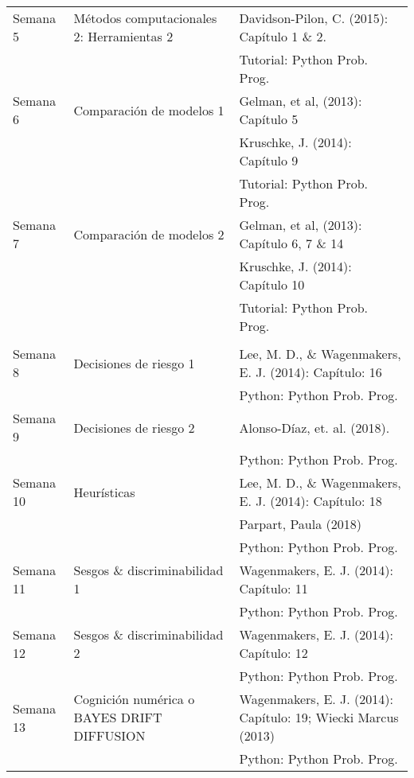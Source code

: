 \documentclass[letterpaper]{inzane_syllabus} %
\begin{document}
\begin{center}
\begin{tabularx}{\textwidth}{p{2cm}p{8cm}p{9.5cm}}
\arrayrulecolor{maingray}\hline
Semana 5 & Métodos computacionales 2: Herramientas 2  & Davidson-Pilon, C. (2015): Capítulo 1 \& 2. \\ &  & Tutorial:  Python Prob. Prog. \\ 

\arrayrulecolor{maingray}\hline
Semana 6 &  Comparaci\'on de modelos 1  & Gelman, et al, (2013): Cap\'itulo 5 \\ & & Kruschke, J. (2014): Cap\'itulo 9 \\  & & Tutorial: Python Prob. Prog. \\

\arrayrulecolor{maingray}\hline
Semana 7 & Comparaci\'on de modelos 2 & Gelman, et al, (2013): Cap\'itulo 6, 7 \& 14 \\ & & Kruschke, J. (2014): Cap\'itulo 10 \\ & & Tutorial:  Python Prob. Prog. \\


 \arrayrulecolor{myCOLOR}\hline
\multicolumn{2}{l}{\textbf{\textcolor{myCOLOR}{\large MODULO 2:  Cognici\'on Bayesiana }}} \\
\hline
 Semana 8 & Decisiones de riesgo 1 & Lee, M. D., \& Wagenmakers, E. J. (2014): Cap\'itulo: 16 \\ & & Python: Python Prob. Prog. \\
 
 \arrayrulecolor{maingray}\hline
Semana 9 & Decisiones de riesgo 2 & Alonso-Díaz, et. al. (2018). \\ & & Python: Python Prob. Prog. \\

\arrayrulecolor{maingray}\hline
Semana 10 & Heur\'isticas  & Lee, M. D., \& Wagenmakers, E. J. (2014): Cap\'itulo: 18 \\ & & Parpart, Paula (2018) \\ & & Python: Python Prob. Prog. \\

\arrayrulecolor{maingray}\hline
Semana 11 & Sesgos \& discriminabilidad 1 & Wagenmakers, E. J. (2014): Cap\'itulo: 11  \\ & & Python: Python Prob. Prog. \\

\arrayrulecolor{maingray}\hline
Semana 12 & Sesgos \& discriminabilidad 2 & Wagenmakers, E. J. (2014): Cap\'itulo: 12  \\ & & Python: Python Prob. Prog. \\

\arrayrulecolor{maingray}\hline
Semana 13 & Cognici\'on num\'erica o BAYES DRIFT DIFFUSION & Wagenmakers, E. J. (2014): Cap\'itulo: 19; Wiecki Marcus (2013)  \\ & & Python: Python Prob. Prog. \\


\end{tabularx}
\end{center}
\end{document}

